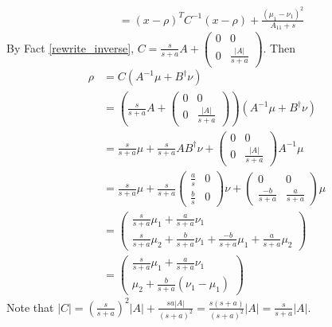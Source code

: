 \documentclass{article}
\begin{document}
\begin{pf}
\begin{align*}
\\&=(x-\rho)^TC^{-1}(x-\rho)+\frac{(\mu_1-\nu_1)^2}{A_{11}+s}
\end{align*}
By Fact \ref{rewrite_inverse}, $C=\frac{s}{s+a}A+\left(\begin{array}{cc}0 & 0 \\ 0 & \frac{|A|}{s+a} \end{array}\right)$. Then
\begin{align*}
\rho&=C(A^{-1}\mu+B^\dagger\nu)
\\&=\left(\frac{s}{s+a}A+\left(\begin{array}{cc}0 & 0 \\ 0 & \frac{|A|}{s+a} \end{array}\right)\right)(A^{-1}\mu+B^\dagger\nu)
\\&=\frac{s}{s+a}\mu+\frac{s}{s+a}AB^\dagger\nu+\left(\begin{array}{cc}0 & 0 \\ 0 & \frac{|A|}{s+a} \end{array}\right)A^{-1}\mu
\\&=\frac{s}{s+a}\mu+\frac{s}{s+a}\left(\begin{array}{cc}\frac{a}{s} & 0 \\ \frac{b}{s} & 0 \end{array}\right)\nu+\left(\begin{array}{cc}0 & 0 \\ \frac{-b}{s+a} & \frac{a}{s+a} \end{array}\right)\mu
\\&=\left(\begin{array}{c}\frac{s}{s+a}\mu_1+\frac{a}{s+a}\nu_1 
\\\frac{s}{s+a}\mu_2+\frac{b}{s+a}\nu_1+\frac{-b}{s+a}\mu_1+\frac{a}{s+a}\mu_2
\end{array}\right)
\\&=\left(\begin{array}{c}\frac{s}{s+a}\mu_1+\frac{a}{s+a}\nu_1 
\\\mu_2+\frac{b}{s+a}(\nu_1-\mu_1)
\end{array}\right)
\end{align*}
Note that $|C|=(\frac{s}{s+a})^2|A|+\frac{sa|A|}{(s+a)^2}=\frac{s(s+a)}{(s+a)^2}|A|=\frac{s}{s+a}|A|$.
\end{pf}




\end{document}
